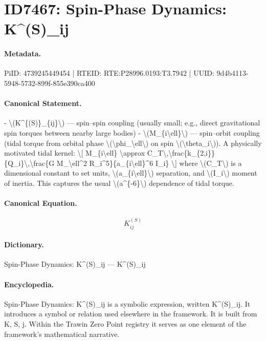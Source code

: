 \section*{ID7467: Spin-Phase Dynamics: K\textasciicircum{}(S)\_ij}
\paragraph{Metadata.}
PiID: 4739245449454 | RTEID: RTE:P28996.0193:T3.7942 | UUID: 9d4b4113-5948-5732-899f-855e390ca400

\paragraph{Canonical Statement.}
- \textbackslash{}(K\textasciicircum{}\{(S)\}\_\{ij\}\textbackslash{}) — spin–spin coupling (usually small; e.g., direct gravitational spin torques between nearby large bodies) - \textbackslash{}(M\_\{i\textbackslash{}ell\}\textbackslash{}) — spin–orbit coupling (tidal torque from orbital phase \textbackslash{}(\textbackslash{}phi\_\textbackslash{}ell\textbackslash{}) on spin \textbackslash{}(\textbackslash{}theta\_i\textbackslash{})). A physically motivated tidal kernel: \textbackslash{}[ M\_\{i\textbackslash{}ell\} \textbackslash{}approx C\_T\textbackslash{},\textbackslash{}frac\{k\_\{2,i\}\}\{Q\_i\}\textbackslash{},\textbackslash{}frac\{G M\_\textbackslash{}ell\textasciicircum{}2 R\_i\textasciicircum{}5\}\{a\_\{i\textbackslash{}ell\}\textasciicircum{}6 I\_i\} \textbackslash{}] where \textbackslash{}(C\_T\textbackslash{}) is a dimensional constant to set units, \textbackslash{}(a\_\{i\textbackslash{}ell\}\textbackslash{}) separation, and \textbackslash{}(I\_i\textbackslash{}) moment of inertia. This captures the usual \textbackslash{}(a\textasciicircum{}\{-6\}\textbackslash{}) dependence of tidal torque.

\paragraph{Canonical Equation.}
\[
K^{(S)}_{ij}
\]

\paragraph{Dictionary.}
Spin-Phase Dynamics: K\textasciicircum{}(S)\_ij — K\textasciicircum{}(S)\_ij

\paragraph{Encyclopedia.}
Spin-Phase Dynamics: K\textasciicircum{}(S)\_ij is a symbolic expression, written K\textasciicircum{}(S)\_ij. It introduces a symbol or relation used elsewhere in the framework. It is built from K, S, j. Within the Trawin Zero Point registry it serves as one element of the framework's mathematical narrative.
